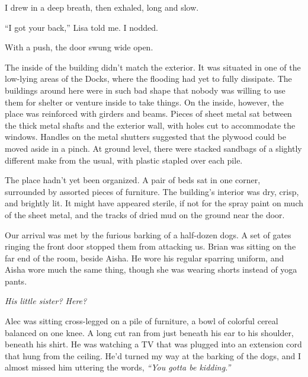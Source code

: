 








I drew in a deep breath, then exhaled, long and slow.



``I got your back,'' Lisa told me.  I nodded.



With a push, the door swung wide open.



The inside of the building didn't match the exterior.  It was situated in one of the low-lying areas of the Docks, where the flooding had yet to fully dissipate.  The buildings around here were in such bad shape that nobody was willing to use them for shelter or venture inside to take things.  On the inside, however, the place was reinforced with girders and beams.  Pieces of sheet metal sat between the thick metal shafts and the exterior wall, with holes cut to accommodate the windows.  Handles on the metal shutters suggested that the plywood could be moved aside in a pinch.  At ground level, there were stacked sandbags of a slightly different make from the usual, with plastic stapled over each pile.



The place hadn't yet been organized.  A pair of beds sat in one corner, surrounded by assorted pieces of furniture.  The building's interior was dry, crisp, and brightly lit.  It might have appeared sterile, if not for the spray paint on much of the sheet metal, and the tracks of dried mud on the ground near the door.



Our arrival was met by the furious barking of a half-dozen dogs.  A set of gates ringing the front door stopped them from attacking us.  Brian was sitting on the far end of the room, beside Aisha.  He wore his regular sparring uniform, and Aisha wore much the same thing, though she was wearing shorts instead of yoga pants.



\emph{His little sister? Here?}



Alec was sitting cross-legged on a pile of furniture, a bowl of colorful cereal balanced on one knee.  A long cut ran from just beneath his ear to his shoulder, beneath his shirt.  He was watching a TV that was plugged into an extension cord that hung from the ceiling.  He'd turned my way at the barking of the dogs, and I almost missed him uttering the words, \emph{``You gotta be kidding.''}



